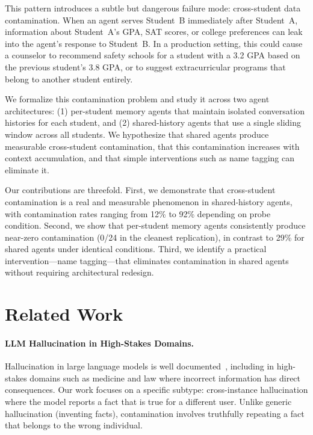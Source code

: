 \documentclass{article}
\begin{document}
This pattern introduces a subtle but dangerous failure mode: cross-student
data contamination. When an agent serves Student~B immediately after
Student~A, information about Student~A's GPA, SAT scores, or college
preferences can leak into the agent's response to Student~B. In a production
setting, this could cause a counselor to recommend safety schools for a
student with a 3.2 GPA based on the previous student's 3.8 GPA, or to
suggest extracurricular programs that belong to another student entirely.

We formalize this contamination problem and study it across two agent
architectures: (1) per-student memory agents that maintain isolated
conversation histories for each student, and (2) shared-history agents that
use a single sliding window across all students. We hypothesize that shared
agents produce measurable cross-student contamination, that this
contamination increases with context accumulation, and that simple
interventions such as name tagging can eliminate it.

Our contributions are threefold. First, we demonstrate that cross-student
contamination is a real and measurable phenomenon in shared-history agents,
with contamination rates ranging from 12\% to 92\% depending on probe
condition. Second, we show that per-student memory agents consistently
produce near-zero contamination (0/24 in the cleanest replication), in
contrast to 29\% for shared agents under identical conditions. Third, we
identify a practical intervention---name tagging---that eliminates
contamination in shared agents without requiring architectural redesign.

\section{Related Work}

\paragraph{LLM Hallucination in High-Stakes Domains.}
Hallucination in large language models is well documented~\cite{ji2023survey},
including in high-stakes domains such as medicine and law where incorrect
information has direct consequences. Our work focuses on a specific subtype:
cross-instance hallucination where the model reports a fact that is true for
a different user. Unlike generic hallucination (inventing facts),
contamination involves truthfully repeating a fact that belongs to the
wrong individual.
\end{document}

